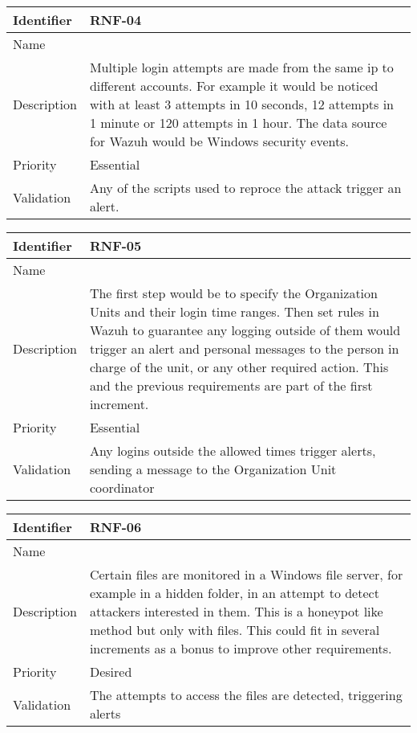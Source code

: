 \begin{table}[H]
	\begin{tabularx}{\textwidth}{|l|X|}
		\hline
		\rowcolor{gray!30}
		Identifier & \textbf{RNF-04} \\ \hline
		Name & \RNFcuatro \\ \hline
		Description & Multiple login attempts are made from the same ip to different accounts. For example it would be noticed with at least 3 attempts in 10 seconds, 12 attempts in 1 minute or 120 attempts in 1 hour. The data source for Wazuh would be Windows security events. \\ \hline
		Priority & Essential \\ \hline
		Validation & Any of the scripts used to reproce the attack trigger an alert. \\ \hline
	\end{tabularx}
\end{table}
\begin{table}[H]
	\begin{tabularx}{\textwidth}{|l|X|}
		\hline
		\rowcolor{gray!30}
		Identifier & \textbf{RNF-05} \\ \hline
		Name & \RNFcinco \\ \hline
		Description & The first step would be to specify the Organization Units and their login time ranges. Then set rules in Wazuh to guarantee any logging outside of them would trigger an alert and personal messages to the person in charge of the unit, or any other required action. \linej This and the previous requirements are part of the first increment.  \\ \hline
		Priority & Essential \\ \hline
		Validation & Any logins outside the allowed times trigger alerts, sending a message to the Organization Unit coordinator  \\ \hline
	\end{tabularx}
\end{table}
\begin{table}[H]
	\begin{tabularx}{\textwidth}{|l|X|}
		\hline
		\rowcolor{gray!30}
		Identifier & \textbf{RNF-06} \\ \hline
		Name & \RNFseis \\ \hline
		Description & Certain files are monitored in a Windows file server, for example in a hidden folder, in an attempt to detect attackers interested in them. This is a honeypot like method but only with files. This could fit in several increments as a bonus to improve other requirements.  \\ \hline
		Priority & Desired \\ \hline
		Validation & The attempts to access the files are detected, triggering alerts \\ \hline
	\end{tabularx}
\end{table}

